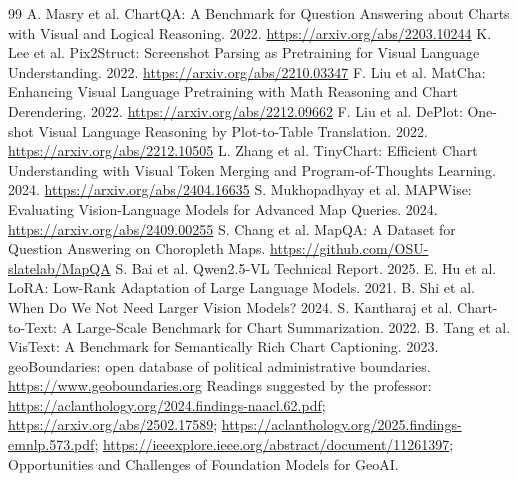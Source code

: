 \documentclass[11pt,a4paper]{article}
\begin{document}
\begin{thebibliography}{99}\small
{} A. Masry et al. ChartQA: A Benchmark for Question Answering about Charts with Visual and Logical Reasoning. 2022. \url{https://arxiv.org/abs/2203.10244}
 K. Lee et al. Pix2Struct: Screenshot Parsing as Pretraining for Visual Language Understanding. 2022. \url{https://arxiv.org/abs/2210.03347}
 F. Liu et al. MatCha: Enhancing Visual Language Pretraining with Math Reasoning and Chart Derendering. 2022. \url{https://arxiv.org/abs/2212.09662}
 F. Liu et al. DePlot: One-shot Visual Language Reasoning by Plot-to-Table Translation. 2022. \url{https://arxiv.org/abs/2212.10505}
 L. Zhang et al. TinyChart: Efficient Chart Understanding with Visual Token Merging and Program-of-Thoughts Learning. 2024. \url{https://arxiv.org/abs/2404.16635}
 S. Mukhopadhyay et al. MAPWise: Evaluating Vision-Language Models for Advanced Map Queries. 2024. \url{https://arxiv.org/abs/2409.00255}
 S. Chang et al. MapQA: A Dataset for Question Answering on Choropleth Maps. \url{https://github.com/OSU-slatelab/MapQA}
 S. Bai et al. Qwen2.5-VL Technical Report. 2025.
 E. Hu et al. LoRA: Low-Rank Adaptation of Large Language Models. 2021.
 B. Shi et al. When Do We Not Need Larger Vision Models? 2024.
 S. Kantharaj et al. Chart-to-Text: A Large-Scale Benchmark for Chart Summarization. 2022.
 B. Tang et al. VisText: A Benchmark for Semantically Rich Chart Captioning. 2023.
 geoBoundaries: open database of political administrative boundaries. \url{https://www.geoboundaries.org}
 Readings suggested by the professor: \url{https://aclanthology.org/2024.findings-naacl.62.pdf}; \url{https://arxiv.org/abs/2502.17589}; \url{https://aclanthology.org/2025.findings-emnlp.573.pdf}; \url{https://ieeexplore.ieee.org/abstract/document/11261397}; Opportunities and Challenges of Foundation Models for GeoAI.
\end{thebibliography}
\end{document}
